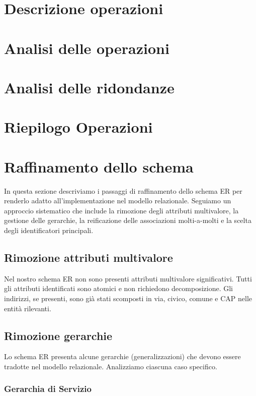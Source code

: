 \documentclass[a4paper,12pt]{report}
\begin{document}
\section{Descrizione operazioni}
\section{Analisi delle operazioni}
\section{Analisi delle ridondanze}
\section{Riepilogo Operazioni}

\section{Raffinamento dello schema}

In questa sezione descriviamo i passaggi di raffinamento dello schema ER per renderlo adatto all'implementazione nel modello relazionale. Seguiamo un approccio sistematico che include la rimozione degli attributi multivalore, la gestione delle gerarchie, la reificazione delle associazioni molti-a-molti e la scelta degli identificatori principali.

\subsection{Rimozione attributi multivalore}

Nel nostro schema ER non sono presenti attributi multivalore significativi. Tutti gli attributi identificati sono atomici e non richiedono decomposizione. Gli indirizzi, se presenti, sono già stati scomposti in via, civico, comune e CAP nelle entità rilevanti.

\subsection{Rimozione gerarchie}

Lo schema ER presenta alcune gerarchie (generalizzazioni) che devono essere tradotte nel modello relazionale. Analizziamo ciascuna caso specifico.

\subsubsection{Gerarchia di Servizio}
\end{document}
